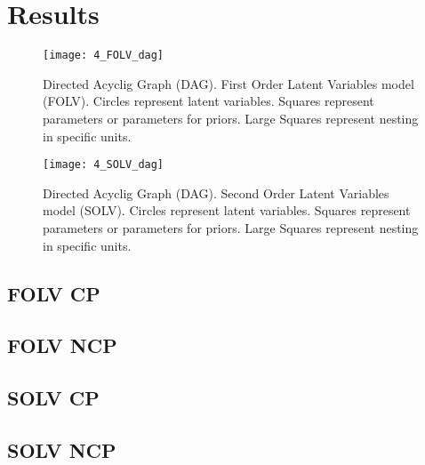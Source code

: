 \section{Results}
%
\begin{figure}[h]
	\centering
	\texttt{[image: 4\_FOLV\_dag]}
	\caption[Directed Acyclig Graph (DAG). First Order Latent Variables model (FOLV).]%
	{Directed Acyclig Graph (DAG). First Order Latent Variables model (FOLV). Circles represent latent variables. Squares represent parameters or parameters for priors. Large Squares represent nesting in specific units.}
	\label{fig:FOLV_model}
\end{figure}
%
\begin{figure}[h]
	\centering
	\texttt{[image: 4\_SOLV\_dag]}
	\caption[Directed Acyclic Graph (DAG). Second Order Latent Variables model (SOLV).]%
	{Directed Acyclig Graph (DAG). Second Order Latent Variables model (SOLV). Circles represent latent variables. Squares represent parameters or parameters for priors. Large Squares represent nesting in specific units.}
	\label{fig:SOLV_model}
\end{figure}

\subsection{FOLV CP}

\subsection{FOLV NCP}

\subsection{SOLV CP}

\subsection{SOLV NCP}

